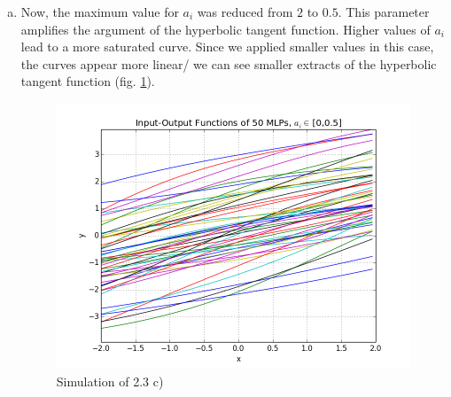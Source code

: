 \documentclass[11pt,a4paper]{article}
\begin{document}
\begin{enumerate}[a)]
\item

Now, the maximum value for $a_i$ was reduced from $2$ to $0.5$. This parameter amplifies the argument of the hyperbolic tangent function. Higher values of $a_i$ lead
to a more saturated curve. Since we applied smaller values in this case, the curves appear more linear/ we can see smaller extracts of the hyperbolic tangent function (fig. \ref{23c}).
\begin{figure}[h]
  \centering
  \includegraphics[width=13 cm]{23c.png}
  \caption{Simulation of 2.3 c) }
  \label{23c}
\end{figure}


\end{enumerate}
\end{document}
